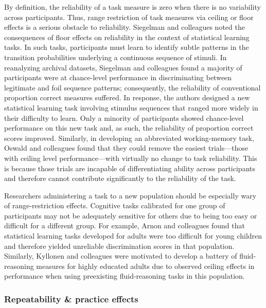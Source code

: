 \documentclass[a4paper,notitlepage,12pt]{article}
\begin{document}
By definition, the reliability of a task measure is zero when there is no variability across participants. Thus, range restriction of task measures via ceiling or floor effects is a serious obstacle to reliability. Siegelman and colleagues \cite{siegelman2017measuring} noted the consequences of floor effects on reliability in the context of statistical learning tasks. In such tasks, participants must learn to identify subtle patterns in the transition probabilities underlying a continuous sequence of stimuli. In reanalyzing archival datasets, Siegelman and colleagues found a majority of participants were at chance-level performance in discriminating between legitimate and foil sequence patterns; consequently, the reliability of conventional proportion correct measures suffered. In response, the authors designed a new statistical learning task involving stimulus sequences that ranged more widely in their difficulty to learn. Only a minority of participants showed chance-level performance on this new task and, as such, the reliability of proportion correct scores improved. Similarly, in developing an abbreviated working-memory task, Oswald and colleagues \cite{oswald2015development} found that they could remove the easiest trials---those with ceiling level performance---with virtually no change to task reliability. This is because those trials are incapable of differentiating ability across participants and therefore cannot contribute significantly to the reliability of the task.

Researchers administering a task to a new population should be especially wary of range-restriction effects. Cognitive tasks calibrated for one group of participants may not be adequately sensitive for others due to being too easy or difficult for a different group. For example, Arnon and colleagues \cite{arnon2020current} found that statistical learning tasks developed for adults were too difficult for young children and therefore yielded unreliable discrimination scores in that population. Similarly, Kyllonen and colleagues \cite{kyllonen2019general} were motivated to develop a battery of fluid-reasoning measures for highly educated adults due to observed ceiling effects in performance when using preexisting fluid-reasoning tasks in this population.  

\subsubsection{Repeatability \& practice effects}
\end{document}
